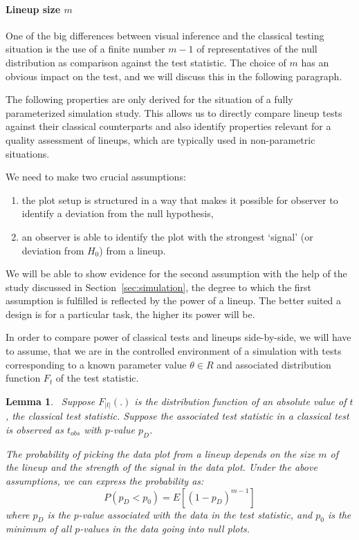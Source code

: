 \documentclass{article}
\newcommand{\red}[1]{{\color{red} #1}}
\newcommand{\hh}[1]{{\color{orange} #1}} %
\newtheorem{lemma}[thm]{Lemma}
\begin{document}

\noindent
\paragraph{Lineup size $m$}
One of the big differences between visual inference and the classical testing situation is the use of a finite number $m-1$ of representatives of the null distribution as comparison against the test statistic. The choice of $m$ has an obvious impact on the test, and we will discuss this in the following paragraph.

The following properties are only derived for the situation of a  fully parameterized  simulation study. This allows us to directly compare lineup tests against their classical counterparts and also identify  properties relevant for a quality assessment of  lineups, which are typically used  in non-parametric situations.

We need to make two crucial assumptions:
\begin{enumerate}
\item  the plot setup is structured in a way that makes it possible for observer to identify a deviation from the null hypothesis,
\item an observer is able to identify the plot with the strongest `signal' (or deviation from $H_0$)  from a lineup.
\end{enumerate}
We will be able to show evidence for the second assumption with the help of the study discussed in Section~\ref{sec:simulation}, \hh{the degree to which the first assumption is fulfilled is reflected} by the power of a lineup. The better suited a design is for a particular task, the higher its power will be.

\hh{In order to compare power of classical tests and lineups side-by-side, we will have to assume, that we are in the controlled environment of a simulation with tests corresponding to a known parameter value $\theta \in R$ and associated distribution function $F_t$ of the test statistic. }

\begin{lemma}~\label{lemma}
Suppose $F_{|t|}(.)$ is the distribution function of an absolute value of $t$, the classical test statistic. Suppose the associated test statistic in a classical test is observed as  $t_{obs}$ with $p$-value $p_D$. 

The probability of picking the data plot from a lineup depends on the size $m$ of the lineup and the strength of the signal in the data plot. 
Under the above assumptions, we can express the probability as:
\[
P(p_D < p_0) =  E\left[ (1 - p_D)^{m-1}\right]
\]
where $p_D$ is the $p$-value associated with the data in the test statistic, and $p_0$ is the minimum of all $p$-values in the data going into null plots.
\end{lemma}
\end{document}
